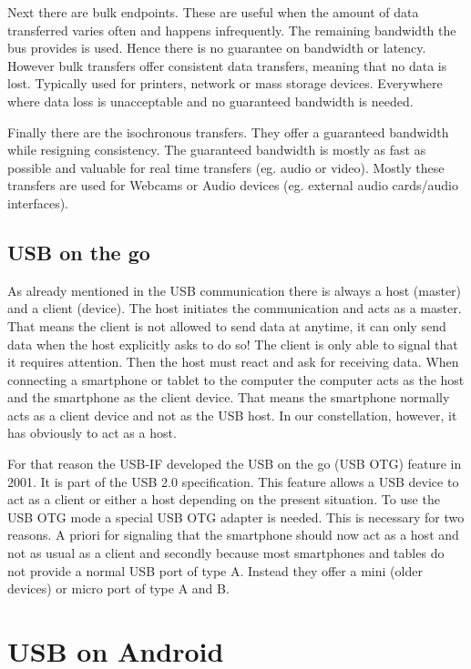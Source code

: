 Next there are bulk endpoints. These are useful when the amount of data transferred varies often and happens infrequently. The remaining bandwidth the bus provides is used. Hence there is no guarantee on bandwidth or latency. However bulk transfers offer consistent data transfers, meaning that no data is lost. Typically used for printers, network or mass storage devices. Everywhere where data loss is unacceptable and no guaranteed bandwidth is needed.

Finally there are the isochronous transfers. They offer a guaranteed bandwidth while resigning consistency. The guaranteed bandwidth is mostly as fast as possible and valuable for real time transfers (eg. audio or video). Mostly these transfers are used for Webcams or Audio devices (eg. external audio cards/audio interfaces).

\section{USB on the go}

As already mentioned in the USB communication there is always a host (master) and a client (device). The host initiates the communication and acts as a master. That means the client is not allowed to send data at anytime, it can only send data when the host explicitly asks to do so! The client is only able to signal that it requires attention. Then the host must react and ask for receiving data. When connecting a smartphone or tablet to the computer the computer acts as the host and the smartphone as the client device. That means the smartphone normally acts as a client device and not as the USB host. In our constellation, however, it has obviously to act as a host. 

For that reason the USB-IF developed the USB on the go (USB OTG) feature in 2001. It is part of the USB 2.0 specification. This feature allows a USB device to act as a client or either a host depending on the present situation. To use the USB OTG mode a special USB OTG adapter is needed. This is necessary for two reasons. A priori for signaling that the smartphone should now act as a host and not as usual as a client and secondly because most smartphones and tables do not provide a normal USB port of type A. Instead they offer a mini (older devices) or micro port of type A and B. 

\chapter{USB on Android}

